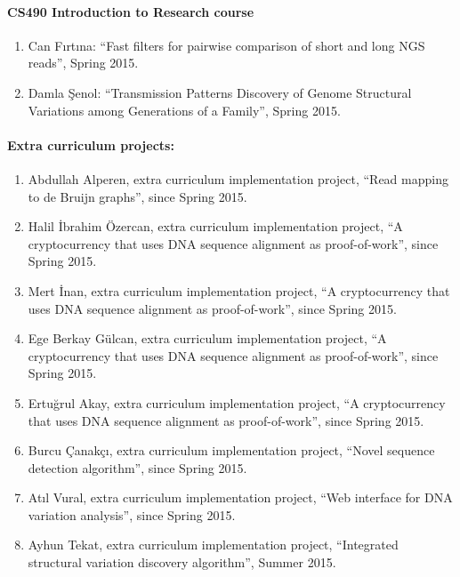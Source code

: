 

\paragraph{CS490 Introduction to Research course}
\begin{enumerate}
\item 
Can Fırtına: ``Fast filters for pairwise comparison of short and long NGS reads'', Spring 2015. 
\item 
Damla Şenol: ``Transmission Patterns Discovery of Genome Structural Variations among Generations of a Family'', Spring 2015. 
\end{enumerate}

\paragraph{Extra curriculum projects:}

\begin{enumerate}
\item 
     Abdullah Alperen, extra curriculum implementation project, ``Read mapping to de Bruijn graphs'', since Spring 2015. 
\item 
      Halil İbrahim Özercan, extra curriculum implementation project, ``A cryptocurrency that uses DNA sequence alignment as proof-of-work'', since Spring 2015. 
\item 
      Mert İnan, extra curriculum implementation project, ``A cryptocurrency that uses DNA sequence alignment as proof-of-work'', since Spring 2015. 
\item 
      Ege Berkay Gülcan, extra curriculum implementation project, ``A cryptocurrency that uses DNA sequence alignment as proof-of-work'', since Spring 2015. 
\item 
      Ertuğrul Akay, extra curriculum implementation project, ``A cryptocurrency that uses DNA sequence alignment as proof-of-work'', since Spring 2015. 
\item
      Burcu Çanakçı, extra curriculum implementation project, ``Novel sequence detection algorithm'', since Spring 2015. 
\item
      Atıl Vural, extra curriculum implementation project, ``Web interface for DNA variation analysis'', since Spring 2015. 
\item
      Ayhun Tekat, extra curriculum implementation project, ``Integrated structural variation discovery algorithm'', Summer 2015. 
\end{enumerate}


